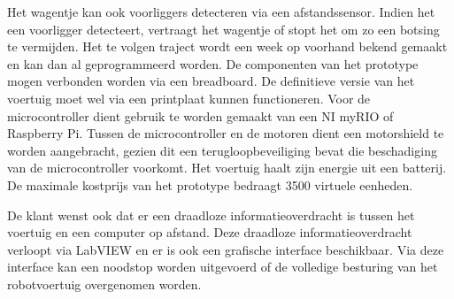 \documentclass[a4paper,kulak]{kulakarticle} %
\begin{document}
Het wagentje kan ook voorliggers detecteren via een afstandssensor. Indien het een voorligger detecteert, vertraagt het wagentje of stopt het om zo een botsing te vermijden.
Het te volgen traject wordt een week op voorhand bekend gemaakt en kan dan al geprogrammeerd worden.
De componenten van het prototype mogen verbonden worden via een breadboard. De definitieve versie van het voertuig moet wel via een printplaat kunnen functioneren. Voor de microcontroller dient gebruik te worden gemaakt van een NI myRIO of Raspberry Pi. Tussen de microcontroller en de motoren dient een motorshield te worden aangebracht, gezien dit een terugloopbeveiliging bevat die beschadiging van de microcontroller voorkomt. Het voertuig haalt zijn energie uit een batterij. De maximale kostprijs van het prototype bedraagt 3500 virtuele eenheden.

De klant wenst ook dat er een draadloze informatieoverdracht is tussen het voertuig en een computer op afstand. Deze draadloze informatieoverdracht verloopt via LabVIEW en er is ook een grafische interface beschikbaar. Via deze interface kan een noodstop worden uitgevoerd of de volledige besturing van het robotvoertuig overgenomen worden.




\newpage




\recalctypearea



\end{document}
